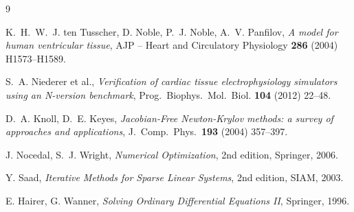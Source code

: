\documentclass[11pt,a4paper]{article}
\begin{document}
\begin{thebibliography}{9}

 K.~H.~W.~J. ten Tusscher, D. Noble, P.~J. Noble, A.~V.
    Panfilov, \emph{A model for human ventricular tissue},
    AJP -- Heart and Circulatory Physiology
    \textbf{286} (2004) H1573--H1589.

 S.~A. Niederer et al.,
    \emph{Verification of cardiac tissue electrophysiology simulators
    using an N-version benchmark}, Prog.\ Biophys.\ Mol.\ Biol.
    \textbf{104} (2012) 22--48.

 D.~A. Knoll, D.~E. Keyes,
    \emph{Jacobian-Free Newton-Krylov methods: a survey of approaches
    and applications}, J.\ Comp.\ Phys.\ \textbf{193}
    (2004) 357--397.

 J. Nocedal, S.~J. Wright,
    \emph{Numerical Optimization}, 2nd edition, Springer, 2006.

 Y. Saad,
    \emph{Iterative Methods for Sparse Linear Systems}, 2nd edition,
    SIAM, 2003.

 E. Hairer, G. Wanner,
    \emph{Solving Ordinary Differential Equations II}, Springer, 1996.

\end{thebibliography}
\end{document}
